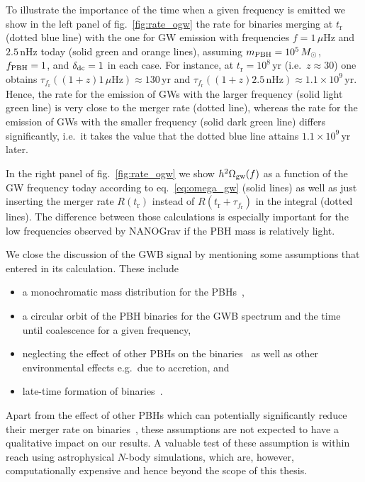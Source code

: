 To illustrate the importance of the time when a given frequency is emitted we show in the left panel of fig.~\ref{fig:rate_ogw} the rate for binaries merging at $t_\text{r}$ (dotted blue line) with the  one for \ac{GW} emission with frequencies $f = 1 \, \mu\mathrm{Hz}$ and $2.5 \, \mathrm{nHz}$ today (solid green and orange lines), assuming $m_{\mathrm{PBH}} = 10^5 \, M_\odot$, $f_{\mathrm{PBH}} = 1$, and $\delta_{\mathrm{dc}} = 1$ in each case. For instance, at $t_\text{r} = 10^8 \, \mathrm{yr}$ (i.e.\ $z \approx 30$) one obtains $\tau_{f_\text{r}}((1+z)1 \, \mu\mathrm{Hz}) \approx 130 \, \mathrm{yr}$ and $\tau_{f_\text{r}}((1+z)2.5 \, \mathrm{nHz}) \approx 1.1 \times 10^9 \, \mathrm{yr}$. Hence, the rate for the emission of \acp{GW} with the larger frequency (solid light green line) is very close to the merger rate (dotted line), whereas the rate for the emission of \acp{GW} with the smaller frequency (solid dark green line) differs significantly, i.e.~it takes the value that the dotted blue line attains $1.1 \times 10^9 \, \mathrm{yr}$ later.

In the right panel of fig.~\ref{fig:rate_ogw} we show $h^2 \Omega_{\text{gw}}(f)$ as a function of the \ac{GW} frequency today according to eq.~\eqref{eq:omega_gw} (solid lines) as well as just inserting the merger rate $R (t_\text{r})$ instead of $R(t_\text{r} + \tau_{f_\text{r}})$ in the integral (dotted lines). The difference between those calculations is especially important for the low frequencies observed by \ac{NANOGrav} if the \ac{PBH} mass is relatively light.

We close the discussion of the \ac{GWB} signal by  mentioning some assumptions that entered in its calculation. These include
\begin{itemize}
	\item a monochromatic mass distribution for the \acp{PBH}~\cite{Raidal:2017mfl},
	\item a circular orbit of the \ac{PBH} binaries for the \ac{GWB} spectrum and the time until coalescence for a given frequency,
	\item neglecting the effect of other \acp{PBH} on the binaries~\cite{Ali-Haimoud:2017rtz,Raidal:2018bbj} as well as other environmental effects e.g.~due to accretion, and
	\item late-time formation of binaries~\cite{Raidal:2017mfl}.
\end{itemize}
Apart from the effect of other \acp{PBH} which can potentially significantly reduce their merger rate on binaries~\cite{Raidal:2018bbj}, these assumptions are not expected to have a qualitative impact on our results. A valuable test of these assumption is within reach using astrophysical $N$-body simulations, which are, however, computationally expensive and hence beyond the scope of this thesis.

